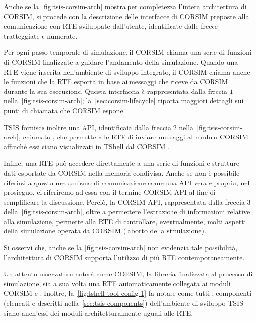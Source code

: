 Anche se la~\vref{fig:tsis-corsim-arch} mostra per completezza l'intera architettura di \acs{CORSIM}, si procede con la descrizione delle interfacce di \acs{CORSIM} preposte alla comunicazione con \acs{RTE} sviluppate dall'utente, identificate dalle frecce tratteggiate e numerate.

Per ogni passo temporale di simulazione, il \acs{CORSIM}  chiama una serie di funzioni di \acs{CORSIM} finalizzate a guidare l'andamento della simulazione. Quando una \acs{RTE} viene inserita nell'ambiente di sviluppo integrato, il \acs{CORSIM}  chiama anche le funzioni che la \acs{RTE} esporta in base ai messaggi che riceve da \acs{CORSIM} durante la sua esecuzione. Questa interfaccia è rappresentata dalla freccia $1$ nella~\vref{fig:tsis-corsim-arch}; la~\vref{sec:corsim-lifecycle} riporta maggiori dettagli sui punti di chiamata che \acs{CORSIM} espone.

\acs{TSIS} fornisce inoltre una \acs{API}, identificata dalla freccia $2$ nella~\vref{fig:tsis-corsim-arch}, chiamata , che permette alle \acs{RTE} di inviare messaggi al modulo \acs{CORSIM}  affinché essi siano visualizzati in \acs{TShell} dal \acs{CORSIM} .

Infine, una \acs{RTE} può accedere direttamente a una serie di funzioni e strutture dati esportate da \acs{CORSIM} nella memoria condivisa. Anche se non è possibile riferirsi a questo meccanismo di comunicazione come una \acs{API} vera e propria, nel prosieguo, ci riferiremo ad essa con il termine \acs{CORSIM} \acs{API} al fine di semplificare la discussione. Perciò, la \acs{CORSIM} \acs{API}, rappresentata dalla freccia $3$ della~\vref{fig:tsis-corsim-arch}, oltre a permettere l'estrazione di informazioni relative alla simulazione, permette alla \acs{RTE} di controllare, eventualmente, molti aspetti della simulazione operata da \acs{CORSIM} (\eg{} aborto della simulazione). 

Si osservi che, anche se la~\vref{fig:tsis-corsim-arch} non evidenzia tale possibilità, l'architettura di \acs{CORSIM} supporta l'utilizzo di più \acs{RTE} contemporaneamente.

\begin{nota}
Un attento osservatore noterà come \acs{CORSIM}, la libreria finalizzata al processo di simulazione, sia a sua volta una \acs{RTE} automaticamente collegata ai moduli \acs{CORSIM}  e . Inoltre, la~\vref{fig:tshell-tool-config-1} fa notare come tutti i componenti (elencati e descritti nella~\vref{sec:tsis-components}) dell'ambiente di sviluppo \acs{TSIS} siano anch'essi dei moduli architetturalmente uguali alle \acs{RTE}.
\end{nota}

